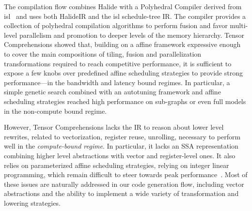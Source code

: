 The compilation flow combines Halide with a Polyhedral Compiler derived from isl~\cite{isl} and uses both HalideIR and the isl schedule-tree IR. The compiler provides a collection of polyhedral compilation algorithms to perform fusion and favor multi-level parallelism and promotion to deeper levels of the memory hierarchy. Tensor Comprehensions showed that, building on a affine framework expressive enough to cover the main compositions of tiling, fusion and parallelization transformations required to reach competitive performance, it is sufficient to expose a few knobs over predefined affine scheduling strategies to provide strong performance---in the bandwidth and latency bound regimes.
In particular, a simple genetic search combined with an autotuning framework and affine scheduling strategies reached high performance on sub-graphs or even full models in the non-compute bound regime.

However, Tensor Comprehensions lacks the IR to reason about lower level rewrites, related to vectorization, register reuse, unrolling, necessary to perform well in the \emph{compute-bound regime}. 
In particular, it lacks an SSA representation combining higher level abstractions with vector and register-level ones. 
It also relies on parameterized affine scheduling strategies, relying on integer linear programming, which remain difficult to steer towards peak performance~\cite{Vas12,Zin18}.
Most of these issues are naturally addressed in our \MLIR code generation flow, including vector abstractions and the ability to implement a wide variety of transformation and lowering strategies.

